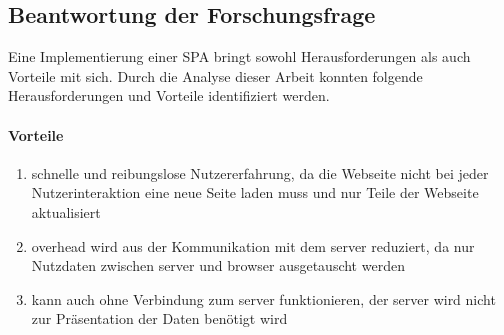 


\subsection{Beantwortung der Forschungsfrage}
Eine Implementierung einer \ac{SPA} bringt sowohl Herausforderungen als auch Vorteile mit sich.
Durch die Analyse dieser Arbeit konnten folgende Herausforderungen und Vorteile identifiziert werden.

\paragraph*{Vorteile}
\begin{enumerate}
    \item schnelle und reibungslose Nutzererfahrung, da die Webseite nicht bei jeder Nutzerinteraktion eine neue Seite laden muss und nur Teile der Webseite aktualisiert
    \item \gls{overhead} wird aus der Kommunikation mit dem \gls{server} reduziert, da nur Nutzdaten zwischen \gls{server} und \gls{browser} ausgetauscht werden
    \item kann auch ohne Verbindung zum \gls{server} funktionieren, der \gls{server} wird nicht zur Präsentation der Daten benötigt wird
\end{enumerate}

